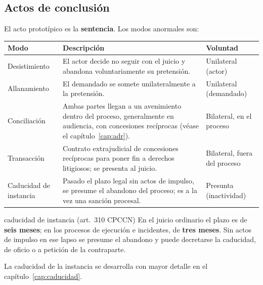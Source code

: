 \documentclass[12pt,oneside]{book}
\renewcommand{\arraystretch}{1.15}
\begin{document}
\subsection{Actos de conclusión}

El acto prototípico es la \textbf{sentencia}. Los modos anormales son:

\begin{table}[H]
\centering
\renewcommand{\arraystretch}{1.25}
\begin{tabularx}{\textwidth}{>{\RaggedRight\arraybackslash}p{}>{\RaggedRight\arraybackslash}X>{\RaggedRight\arraybackslash}p{}}
\toprule
\textbf{Modo} & \textbf{Descripción} & \textbf{Voluntad} \\
\midrule
Desistimiento & El actor decide no seguir con el juicio y abandona voluntariamente su pretensión. & Unilateral (actor) \\
\addlinespace
Allanamiento & El demandado se somete unilateralmente a la pretensión. & Unilateral (demandado) \\
\addlinespace
Conciliación & Ambas partes llegan a un avenimiento dentro del proceso, generalmente en audiencia, con concesiones recíprocas (véase el capítulo~\ref{cap:adr}). & Bilateral, en el proceso \\
\addlinespace
Transacción & Contrato extrajudicial de concesiones recíprocas para poner fin a derechos litigiosos; se presenta al juicio. & Bilateral, fuera del proceso \\
\addlinespace
Caducidad de instancia & Pasado el plazo legal sin actos de impulso, se presume el abandono del proceso; es a la vez una sanción procesal. & Presunta (inactividad) \\
\bottomrule
\end{tabularx}
\end{table}

\begin{norma}{caducidad de instancia (art.~310 CPCCN)}
En el juicio ordinario el plazo es de \textbf{seis meses}; en los procesos de ejecución e incidentes, de \textbf{tres meses}. Sin actos de impulso en ese lapso se presume el abandono y puede decretarse la caducidad, de oficio o a petición de la contraparte.
\end{norma}

La caducidad de la instancia se desarrolla con mayor detalle en el capítulo~\ref{cap:caducidad}.
\end{document}
